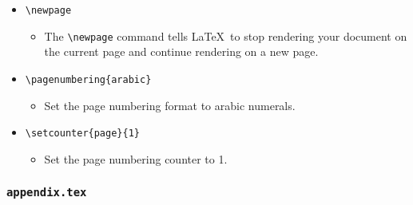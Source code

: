 \begin{itemize}
\begin{itemize}
    \end{itemize}
    \item \lstinline|\newpage|
    \begin{itemize}
        \item The \lstinline|\newpage| command tells \LaTeX\ to stop rendering your document on the current page and continue rendering on a new page.
    \end{itemize}
    \item \lstinline|\pagenumbering{arabic}|
    \begin{itemize}
        \item Set the page numbering format to arabic numerals.
    \end{itemize}
    \item \lstinline|\setcounter{page}{1}|
    \begin{itemize}
        \item Set the page numbering counter to 1.
    \end{itemize}
\end{itemize}

\subsubsection{\texttt{appendix.tex}}
\label{sec:appendix.tex}

